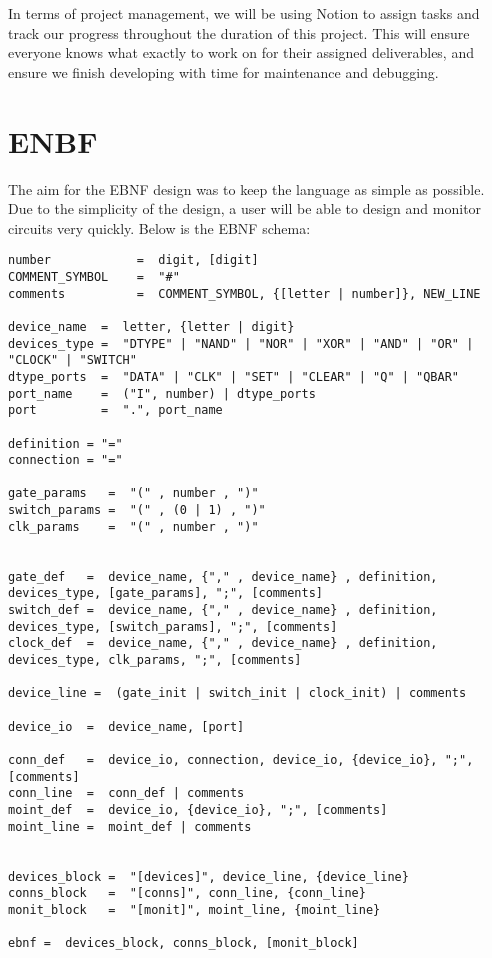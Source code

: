 \documentclass[10pt]{article}
\begin{document}
In terms of project management, we will be using Notion to assign tasks and track our progress throughout the duration of this project. This will ensure everyone knows what exactly to work on for their assigned deliverables, and ensure we finish developing with time for maintenance and debugging. 


\newpage

\section{ENBF}

The aim for the EBNF design was to keep the language as simple as possible. Due to the simplicity of the design, a user will be able to design and monitor circuits very quickly. Below is the EBNF schema:

\begin{lstlisting}[caption=ENBF Schema]
number            =  digit, [digit]
COMMENT_SYMBOL    =  "#"
comments          =  COMMENT_SYMBOL, {[letter | number]}, NEW_LINE

device_name  =  letter, {letter | digit}
devices_type =  "DTYPE" | "NAND" | "NOR" | "XOR" | "AND" | "OR" | "CLOCK" | "SWITCH"
dtype_ports  =  "DATA" | "CLK" | "SET" | "CLEAR" | "Q" | "QBAR"
port_name    =  ("I", number) | dtype_ports
port         =  ".", port_name

definition = "="
connection = "="

gate_params   =  "(" , number , ")"
switch_params =  "(" , (0 | 1) , ")"
clk_params    =  "(" , number , ")"


gate_def   =  device_name, {"," , device_name} , definition, devices_type, [gate_params], ";", [comments]
switch_def =  device_name, {"," , device_name} , definition, devices_type, [switch_params], ";", [comments]
clock_def  =  device_name, {"," , device_name} , definition, devices_type, clk_params, ";", [comments]

device_line =  (gate_init | switch_init | clock_init) | comments

device_io  =  device_name, [port]

conn_def   =  device_io, connection, device_io, {device_io}, ";", [comments]
conn_line  =  conn_def | comments
moint_def  =  device_io, {device_io}, ";", [comments]
moint_line =  moint_def | comments


devices_block =  "[devices]", device_line, {device_line}
conns_block   =  "[conns]", conn_line, {conn_line}
monit_block   =  "[monit]", moint_line, {moint_line}

ebnf =  devices_block, conns_block, [monit_block]

\end{lstlisting}
\end{document}

